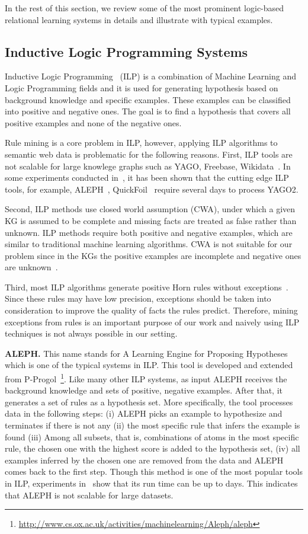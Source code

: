 In the rest of this section, we review some of the most prominent logic-based relational learning systems in details and illustrate with typical examples.

\subsection{Inductive Logic Programming Systems}

Inductive Logic Programming~\cite{ref9} (ILP) is a combination of Machine Learning and Logic Programming fields and it is used for generating hypothesis based on background knowledge and specific examples. These examples can be classified into positive and negative ones. The goal is to find a hypothesis that covers all positive examples and none of the negative ones.

Rule mining is a core problem in ILP, however, applying ILP algorithms to semantic web data is problematic for the following reasons. First, ILP tools are not scalable for large knowlege graphs such as YAGO, Freebase, Wikidata~\cite{ref10}. In some experiments conducted in~\cite{ref10}, it has been shown that the cutting edge ILP tools, for example, ALEPH~\cite{ref14, ref10}, QuickFoil~\cite{ref15, ref10} require several days to process YAGO2.

Second, ILP methods use closed world assumption (CWA), under which a given KG is assumed to be complete and missing facts are treated as false rather than unknown. ILP methods require both positive and negative examples, which are similar to traditional machine learning algorithms. CWA is not suitable for our problem since in the KGs the positive examples are incomplete and negative ones are unknown~\cite{ref10}.

Third, most ILP algorithms generate positive Horn rules without exceptions~\cite{ref11}. Since these rules may have low precision, exceptions should be taken into consideration to improve the quality of facts the rules predict. Therefore, mining exceptions from rules is an important purpose of our work and naively using ILP techniques is not always possible in our setting.

\textbf{ALEPH.} This name stands for A Learning Engine for Proposing Hypotheses which is one of the typical systems in ILP. This tool is developed and extended from P-Progol~\footnote{\url{http://www.cs.ox.ac.uk/activities/machinelearning/Aleph/aleph}}. Like many other ILP systems, as input ALEPH receives the background knowledge and sets of positive, negative examples. After that, it generates a set of rules as a hypothesis set. More specifically, the tool processes data in the following steps: (i) ALEPH picks an example to hypothesize and terminates if there is not any (ii) the most specific rule that infers the example is found (iii) Among all subsets, that is, combinations of atoms in the most specific rule, the chosen one with the highest score is added to the hypothesis set, (iv) all examples inferred by the chosen one are removed from the data and ALEPH comes back to the first step. Though this method is one of the most popular tools in ILP, experiments in~\cite{ref10} show that its run time can be up to days. This indicates that ALEPH is not scalable for large datasets.

